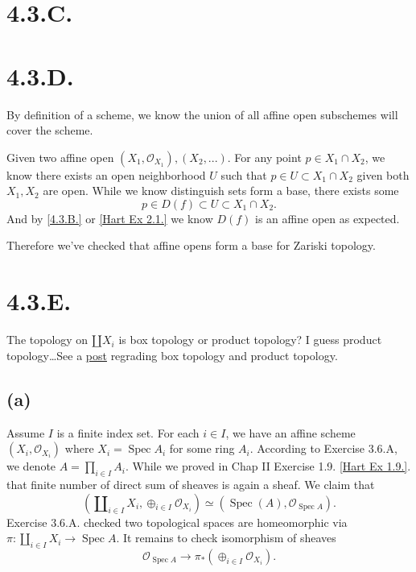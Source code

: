 \section{4.3.C.}
\section{4.3.D.}

By definition of a scheme, we know the union of all affine open subschemes will cover the scheme. 

Given two affine open $(X_1,\mathcal O_{X_1}), (X_2,...)$. For any point $p\in X_1\cap X_2$, we know there exists an open neighborhood $U$ such that $p\in U\subset X_1\cap X_2$ given both $X_1,X_2$ are open. While we know distinguish sets form a base, there exists some \[p\in D(f)\subset U\subset X_1\cap X_2.\] And by \ref{4.3.B.} or \ref{Hart Ex 2.1.} we know $D(f)$ is an affine open as expected. 

Therefore we've checked that affine opens form a base for Zariski topology.

\section{4.3.E.}\label{4.3.E.}

The topology on $\amalg X_i$ is box topology or product topology? I guess product topology\dots See a \href{https://math.stackexchange.com/questions/871610/why-are-box-topology-and-product-topology-different-on-infinite-products-of-topo}{post} regrading box topology and product topology.

\subsection{(a)}

Assume $I$ is a finite index set. For each $i\in I$, we have an affine scheme $(X_i,\mathcal O_{X_i})$ where $X_i=\operatorname{Spec}A_i$ for some ring $A_i$. According to Exercise 3.6.A, we denote $A=\prod_{i\in I}A_i$. While we proved in \cite{hartshorne2013algebraic} Chap II Exercise 1.9. \ref{Hart Ex 1.9.}. that finite number of direct sum of sheaves is again a sheaf. We claim that
\[(\amalg_{i\in I} X_i,\oplus_{i\in I}\mathcal O_{X_i})\simeq (\operatorname{Spec}(A),\mathcal O_{\operatorname{Spec}A}).\]
Exercise 3.6.A. checked two topological spaces are homeomorphic via $\pi:\amalg_{i\in I} X_i\to \operatorname{Spec}A$. It remains to check isomorphism of sheaves 
\[\mathcal O_{\operatorname{Spec}A}\to\pi_{\ast}(\oplus_{i\in I}\mathcal O_{X_i}).\]

